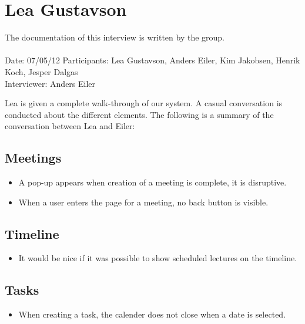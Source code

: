 
\section{Lea Gustavson}
\label{app:leademo}
The documentation of this interview is written by the \timelinegroup{} group. \\ \ \\
Date: 07/05/12
Participants: Lea Gustavson, Anders Eiler, Kim Jakobsen, Henrik Koch, Jesper Dalgas \\
Interviewer: Anders Eiler

Lea is given a complete walk-through of our system.
A casual conversation is conducted about the different elements.
The following is a summary of the conversation between Lea and Eiler:

\subsection*{Meetings}
\begin{itemize}
	\item A pop-up appears when creation of a meeting is complete, it is disruptive.
	\item When a user enters the page for a meeting, no back button is visible.
\end{itemize}


\subsection*{Timeline}
\begin{itemize}
	\item It would be nice if it was possible to show scheduled lectures on the timeline.
\end{itemize}


\subsection*{Tasks}
\begin{itemize}
	\item When creating a task, the calender does not close when a date is selected.
\end{itemize}


